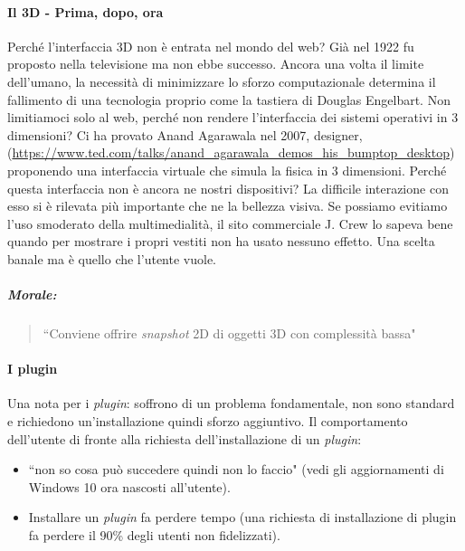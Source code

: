 			\paragraph{Il 3D - Prima, dopo, ora}
				Perché l'interfaccia 3D non è entrata nel mondo del web? Già nel 1922 fu proposto nella televisione ma non ebbe successo. Ancora una volta il limite dell'umano, la necessità di minimizzare lo sforzo computazionale determina il fallimento di una tecnologia proprio come la tastiera di Douglas Engelbart. 
				Non limitiamoci solo al web, perché non rendere l'interfaccia dei sistemi operativi in 3 dimensioni? Ci ha provato Anand Agarawala nel 2007, designer, (\url{https://www.ted.com/talks/anand_agarawala_demos_his_bumptop_desktop}) proponendo una interfaccia virtuale che simula la fisica in 3 dimensioni. Perché questa interfaccia non è ancora ne nostri dispositivi? La difficile interazione con esso si è rilevata più importante che ne la bellezza visiva.
				Se possiamo evitiamo l'uso smoderato della multimedialità, il sito commerciale J. Crew lo sapeva bene quando per mostrare i propri vestiti non ha usato nessuno effetto. Una scelta banale ma è quello che l'utente vuole.
				
				\subparagraph*{Morale:}
				\begin{quote}
					``Conviene offrire \emph{snapshot} 2D di oggetti 3D con complessità bassa"
				\end{quote}
				
			\paragraph{I plugin}
				Una nota per i \emph{plugin}: soffrono di un problema fondamentale, non sono standard e richiedono un'installazione quindi sforzo aggiuntivo. Il comportamento dell'utente di fronte alla richiesta dell'installazione di un \emph{plugin}:
				\begin{itemize}
					\item ``non so cosa può succedere quindi non lo faccio" (vedi gli aggiornamenti di Windows 10 ora nascosti all'utente).
					\item Installare un \emph{plugin} fa perdere tempo (una richiesta di installazione di plugin fa perdere il 90\% degli utenti non fidelizzati).
				\end{itemize}
			

